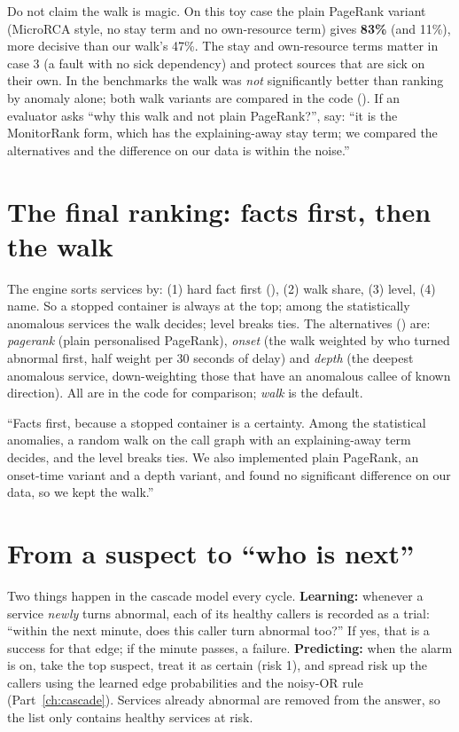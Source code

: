 \begin{warnbox}
Do not claim the walk is magic. On this toy case the plain PageRank variant (MicroRCA style, no stay term and no own-resource term) gives  \textbf{83\%} (and  11\%), more decisive than our walk's 47\%. The stay and own-resource terms matter in case 3 (a fault with no sick dependency) and protect sources that are sick on their own. In the benchmarks the walk was \emph{not} significantly better than ranking by anomaly alone; both walk variants are compared in the code (). If an evaluator asks ``why this walk and not plain PageRank?'', say: ``it is the MonitorRank form, which has the explaining-away stay term; we compared the alternatives and the difference on our data is within the noise.''
\end{warnbox}

\section{The final ranking: facts first, then the walk}
\begin{techbox}
The engine sorts services by: (1) hard fact first (), (2) walk share, (3) level, (4) name. So a stopped container is always at the top; among the statistically anomalous services the walk decides; level breaks ties. The alternatives () are: \emph{pagerank} (plain personalised PageRank), \emph{onset} (the walk weighted by who turned abnormal first, half weight per 30 seconds of delay) and \emph{depth} (the deepest anomalous service, down-weighting those that have an anomalous callee of known direction). All are in the code for comparison; \emph{walk} is the default.
\end{techbox}

\begin{saybox}
``Facts first, because a stopped container is a certainty. Among the statistical anomalies, a random walk on the call graph with an explaining-away term decides, and the level breaks ties. We also implemented plain PageRank, an onset-time variant and a depth variant, and found no significant difference on our data, so we kept the walk.''
\end{saybox}

\section{From a suspect to ``who is next''}
\begin{simplebox}
Two things happen in the cascade model every cycle. \textbf{Learning:} whenever a service \emph{newly} turns abnormal, each of its healthy callers is recorded as a trial: ``within the next minute, does this caller turn abnormal too?'' If yes, that is a success for that edge; if the minute passes, a failure. \textbf{Predicting:} when the alarm is on, take the top suspect, treat it as certain (risk 1), and spread risk up the callers using the learned edge probabilities and the noisy-OR rule (Part~\ref{ch:cascade}). Services already abnormal are removed from the answer, so the list only contains healthy services at risk.
\end{simplebox}

